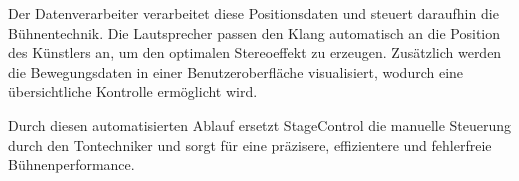 Der Datenverarbeiter verarbeitet diese Positionsdaten und steuert daraufhin die Bühnentechnik. Die Lautsprecher passen den Klang automatisch an die Position des Künstlers an, um den optimalen Stereoeffekt zu erzeugen.  Zusätzlich werden die Bewegungsdaten in einer Benutzeroberfläche visualisiert, wodurch eine übersichtliche Kontrolle  ermöglicht wird.  

Durch diesen automatisierten Ablauf ersetzt StageControl die manuelle Steuerung durch den Tontechniker und sorgt für eine präzisere, effizientere und fehlerfreie Bühnenperformance.
